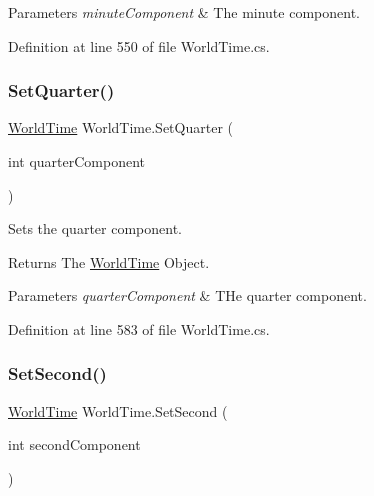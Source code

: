 \begin{DoxyParams}{Parameters}
{\em minute\+Component} & The minute component.\\
\hline
\end{DoxyParams}


Definition at line 550 of file World\+Time.\+cs.

\mbox{\label{struct_world_time_a0f9c8d072e53df90474a107674d4973b}} 
\subsubsection{\texorpdfstring{Set\+Quarter()}{SetQuarter()}}
{\footnotesize\ttfamily \hyperlink{struct_world_time}{World\+Time} World\+Time.\+Set\+Quarter (\begin{DoxyParamCaption}\item[{int}]{quarter\+Component }\end{DoxyParamCaption})}



Sets the quarter component. 

\begin{DoxyReturn}{Returns}
The \hyperlink{struct_world_time}{World\+Time} Object.
\end{DoxyReturn}

\begin{DoxyParams}{Parameters}
{\em quarter\+Component} & T\+He quarter component.\\
\hline
\end{DoxyParams}


Definition at line 583 of file World\+Time.\+cs.

\mbox{\label{struct_world_time_a957c6cddd805cee67195747362f80e31}} 
\subsubsection{\texorpdfstring{Set\+Second()}{SetSecond()}}
{\footnotesize\ttfamily \hyperlink{struct_world_time}{World\+Time} World\+Time.\+Set\+Second (\begin{DoxyParamCaption}\item[{int}]{second\+Component }\end{DoxyParamCaption})}



